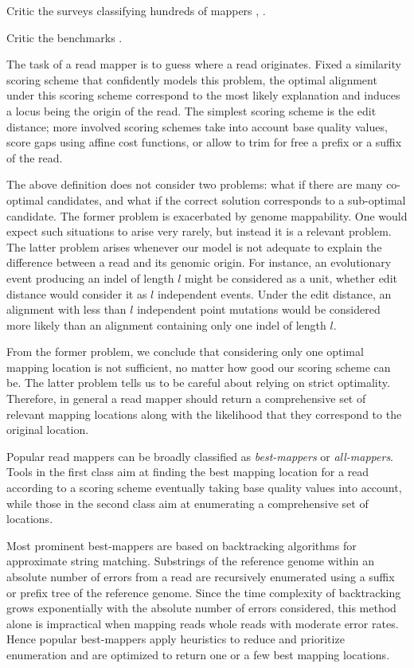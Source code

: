 Critic the surveys classifying hundreds of mappers \citep{Li2010}, \citep{Fonseca2012}.

Critic the benchmarks \citep{Hatem2013} \citep{Holtgrewe2011}.

The task of a read mapper is to guess where a read originates.
Fixed a similarity scoring scheme that confidently models this problem, the optimal alignment under this scoring scheme correspond to the most likely explanation and induces a locus being the origin of the read.
The simplest scoring scheme is the edit distance; more involved scoring schemes take into account base quality values, score gaps using affine cost functions, or allow to trim for free a prefix or a suffix of the read.

The above definition does not consider two problems: what if there are many co-optimal candidates, and what if the correct solution corresponds to a sub-optimal candidate.
The former problem is exacerbated by genome mappability.
One would expect such situations to arise very rarely, but instead it is a relevant problem.
The latter problem arises whenever our model is not adequate to explain the difference between a read and its genomic origin.
For instance, an evolutionary event producing an indel of length $l$ might be considered as a unit, whether edit distance would consider it as $l$ independent events.
Under the edit distance, an alignment with less than $l$ independent point mutations would be considered more likely than an alignment containing only one indel of length $l$.

From the former problem, we conclude that considering only one optimal mapping location is not sufficient, no matter how good our scoring scheme can be.
The latter problem tells us to be careful about relying on strict optimality.
Therefore, in general a read mapper should return a comprehensive set of relevant mapping locations along with the likelihood that they correspond to the original location.

Popular read mappers can be broadly classified as \emph{best-mappers} or \emph{all-mappers}.
Tools in the first class aim at finding the best mapping location for a read according to a scoring scheme eventually taking base quality values into account, while those in the second class aim at enumerating a comprehensive set of locations.

Most prominent best-mappers are based on backtracking algorithms for approximate string matching.
Substrings of the reference genome within an absolute number of errors from a read are recursively enumerated using a suffix or prefix tree of the reference genome.
Since the time complexity of backtracking grows exponentially with the absolute number of errors considered, this method alone is impractical when mapping reads whole reads with moderate error rates. 
Hence popular best-mappers apply heuristics to reduce and prioritize enumeration and are optimized to return one or a few best mapping locations.

